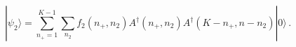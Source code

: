\begin{equation}
|\psi_2\rangle=\sum_{n_+=1}^{K-1} \sum_{n_2}
f_2(n_+,n_2)A^\dagger(n_+,n_2)A^\dagger(K-n_+,n-n_2)|0\rangle\,.
\end{equation}

